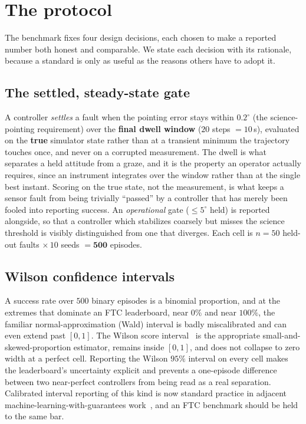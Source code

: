 \documentclass[11pt]{article}
\begin{document}
\section{The protocol}
The benchmark fixes four design decisions, each chosen to make a reported number both honest and
comparable. We state each decision with its rationale, because a standard is only as useful as the
reasons others have to adopt it.

\subsection{The settled, steady-state gate} A controller \emph{settles} a fault when the pointing
error stays within $\mathbf{0.2^\circ}$ (the science-pointing requirement) over the \textbf{final dwell
window} ($20$ steps $=10$\,s), evaluated on the \textbf{true} simulator state rather than at a
transient minimum the trajectory touches once, and never on a corrupted measurement. The dwell is
what separates a held attitude from a graze, and it is the property an operator actually requires,
since an instrument integrates over the window rather than at the single best instant. Scoring on the
true state, not the measurement, is what keeps a sensor fault from being trivially ``passed'' by a
controller that has merely been fooled into reporting success. An \emph{operational} gate ($\leq 5^\circ$ held)
is reported alongside, so that a controller which stabilizes coarsely but misses the science
threshold is visibly distinguished from one that diverges. Each cell is $n{=}50$ held-out faults
$\times\,10$ seeds $=\mathbf{500}$ episodes.

\subsection{Wilson confidence intervals} A success rate over $500$ binary episodes is a binomial
proportion, and at the extremes that dominate an FTC leaderboard, near $0\%$ and near $100\%$, the
familiar normal-approximation (Wald) interval is badly miscalibrated and can even extend past
$[0,1]$. The Wilson score interval~\cite{Wilson} is the appropriate small-and-skewed-proportion
estimator, remains inside $[0,1]$, and does not collapse to zero width at a perfect cell. Reporting
the Wilson $95\%$ interval on every cell makes the leaderboard's uncertainty explicit and prevents a
one-episode difference between two near-perfect controllers from being read as a real separation.
Calibrated interval reporting of this kind is now standard practice in adjacent
machine-learning-with-guarantees work~\cite{Angelopoulos2023}, and an FTC benchmark should be held to
the same bar.
\end{document}
